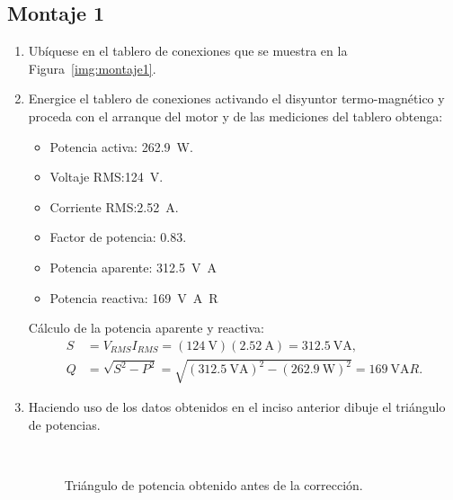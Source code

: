 \documentclass[12pt,a4paper]{article}
\begin{document}
\subsection{Montaje 1}
\begin{enumerate}
    \item Ubíquese en el tablero de conexiones que se muestra en la Figura~\ref{img:montaje1}.
    

    \item Energice el tablero de conexiones activando el disyuntor termo-magnético y proceda con el arranque del motor y de las mediciones del tablero obtenga:
    \begin{itemize}
        \item Potencia activa: \SI{262.9}{\watt}.
        \item Voltaje RMS:\@ \SI{124}{\volt}.
        \item Corriente RMS:\@ \SI{2.52}{\ampere}.
        \item Factor de potencia: $0.83$.
        \item Potencia aparente: \SI{312.5}{\volt\ampere}
        \item Potencia reactiva: \SI{169}{\volt\ampere{R}}
    \end{itemize}

    Cálculo de la potencia aparente y reactiva:
    \begin{align*}
        S &= V_{RMS}I_{RMS} = (\SI{124}{\volt})(\SI{2.52}{\ampere})=\SI{312.5}{\volt\ampere},\\
        Q &= \sqrt{S^2-P^2}=\sqrt{{(\SI{312.5}{\volt\ampere})}^2-{(\SI{262.9}{\watt})}^2}=\SI{169}{\volt\ampere{R}}.
    \end{align*}

    \item Haciendo uso de los datos obtenidos en el inciso anterior dibuje el triángulo de potencias.
    \begin{figure}[H]
        \centering
        \caption{Triángulo de potencia obtenido antes de la corrección.}
~\label{fig:p5-triangulo-medido}
    \end{figure}


\end{enumerate}
\end{document}
